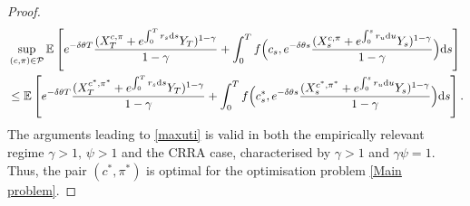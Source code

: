 \documentclass[12,reqno]{amsart}
\numberwithin{equation}{section}
\begin{document}
\begin{proof}
\begin{align}
		&\sup_{(c,\pi)\in\mathcal{P}}\mathbb{E}\left[e^{-\delta\theta T}\frac{(X_{T}^{c,\pi}+e^{\int_{0}^{T}r_{s}\mathrm{d}s}Y_{T})^{1-\gamma}}{1-\gamma}+\int_{0}^{T}f\Big(c_{s},e^{-\delta\theta s} \frac{(X_{s}^{c,\pi}+e^{\int_{0}^{s}r_{u}\mathrm{d}u}Y_{s}) ^{1-\gamma}}{1-\gamma}\Big)\mathrm{d}s\right]\notag\\
		&\leq\mathbb{E}\left[e^{-\delta\theta T}\frac{(X_{T}^{c^{*},\pi^{*}}+e^{\int_{0}^{T}r_{s}\mathrm{d}s}Y_{T})^{1-\gamma}}{1-\gamma}+\int_{0}^{T}f\Big(c_{s}^{*},e^{-\delta\theta s} \frac{(X_{s}^{c^{*},\pi^{*}}+e^{\int_{0}^{s}r_{u}\mathrm{d}u}Y_{s})^{1-\gamma}}{1-\gamma}\Big)\mathrm{d}s\right].
	\end{align}
	The arguments leading to \eqref{maxuti} is valid in both the empirically relevant regime $\gamma>1,\,\psi>1$ and the CRRA case, characterised by $\gamma>1$ and $\gamma\psi=1$. Thus, the pair $(c^{*},\pi^{*})$ is optimal for the optimisation problem \eqref{Main problem}.
\end{proof}
\end{document}
